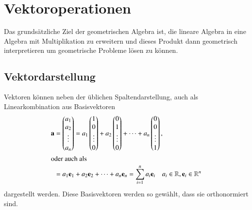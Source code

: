 \section{Vektoroperationen\label{clifford:section:Vektoroperationen}}
Das grundsätzliche Ziel der geometrischen Algebra ist, die lineare Algebra in eine Algebra mit Multiplikation zu erweitern und dieses Produkt dann geometrisch interpretieren um  geometrische Probleme lösen zu können.
 \subsection{Vektordarstellung\label{clifford:section:Vektordarstellung}}
Vektoren können neben der üblichen Spaltendarstellung, auch als Linearkombination aus Basisvektoren
\begin{align}
    \textbf{a} 
    &=
    \begin{pmatrix} 
    a_1 \\ a_2 \\ \vdots \\ a_n   
    \end{pmatrix} 
    =
    a_1 \begin{pmatrix}
    1 \\ 0 \\ \vdots \\ 0  
    \end{pmatrix} 
    + 
    a_2\begin{pmatrix} 
    0 \\ 1 \\ \vdots \\ 0  
    \end{pmatrix} + \dots 
    + 
    a_n\begin{pmatrix}
    0 \\ 0 \\ \vdots \\ 1  
    \end{pmatrix},\\
\intertext{oder auch als}
    &= 
    a_1\textbf{e}_1 
    +
    a_2\textbf{e}_2
    + 
    \dots + a_n\textbf{e}_n
    = 
    \sum_{i=1}^{n} a_i \textbf{e}_i
    \quad
    a_i \in \mathbb{R}
    , \textbf{e}_i \in \mathbb{R}^n
\end{align}
dargestellt werden.
Diese Basisvektoren werden so gewählt, dass sie orthonormiert sind. 
